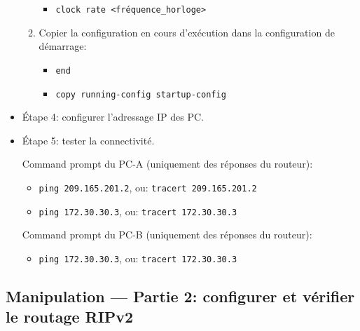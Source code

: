 \documentclass[a4paper]{article}
\begin{document}
\begin{itemize}
\begin{enumerate}
    \begin{example}
        \begin{itemize}
            \item \texttt{clock rate <fréquence\_horloge>}
        \end{itemize}
    \end{example}
    \item Copier la configuration en cours d'exécution dans la configuration de démarrage:
    \begin{example}
        \begin{itemize}
            \item \texttt{end}
            \item \texttt{copy running-config startup-config}
        \end{itemize}
    \end{example}
\end{enumerate}





\item Étape 4: configurer l'adressage IP des PC.





\item Étape 5: tester la connectivité.
\begin{example}
    Command prompt du PC-A (uniquement des réponses du routeur):
    \begin{itemize}
        \item \texttt{ping 209.165.201.2}, ou: \texttt{tracert 209.165.201.2}
        \item \texttt{ping 172.30.30.3}, ou: \texttt{tracert 172.30.30.3}
    \end{itemize}
    Command prompt du PC-B (uniquement des réponses du routeur):
    \begin{itemize}
        \item \texttt{ping 172.30.30.3}, ou: \texttt{tracert 172.30.30.3}
    \end{itemize}
\end{example}





\end{itemize}










\subsection{Manipulation --- Partie 2: configurer et vérifier le routage RIPv2}
\end{document}
